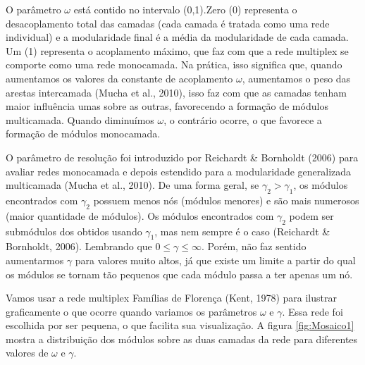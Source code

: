 \documentclass[
  12pt,
]{article}
\begin{document}
O parâmetro \(\omega\) está contido no intervalo (0,1).Zero (0)
representa o desacoplamento total das camadas (cada camada é tratada
como uma rede individual) e a modularidade final é a média da
modularidade de cada camada. Um (1) representa o acoplamento máximo, que
faz com que a rede multiplex se comporte como uma rede monocamada. Na
prática, isso significa que, quando aumentamos os valores da constante
de acoplamento \(\omega\), aumentamos o peso das arestas intercamada
(Mucha et al., 2010), isso faz com que as camadas tenham maior
influência umas sobre as outras, favorecendo a formação de módulos
multicamada. Quando diminuímos \(\omega\), o contrário ocorre, o que
favorece a formação de módulos monocamada.

O parâmetro de resolução foi introduzido por Reichardt \& Bornholdt
(2006) para avaliar redes monocamada e depois estendido para a
modularidade generalizada multicamada (Mucha et al., 2010). De uma forma
geral, se \(\gamma_2 > \gamma_1\), os módulos encontrados com
\(\gamma_2\) possuem menos nós (módulos menores) e são mais numerosos
(maior quantidade de módulos). Os módulos encontrados com \(\gamma_2\)
podem ser submódulos dos obtidos usando \(\gamma_1\), mas nem sempre é o
caso (Reichardt \& Bornholdt, 2006). Lembrando que
\(0 \leq \gamma \leq \infty\). Porém, não faz sentido aumentarmos
\(\gamma\) para valores muito altos, já que existe um limite a partir do
qual os módulos se tornam tão pequenos que cada módulo passa a ter
apenas um nó.

Vamos usar a rede multiplex Famílias de Florença (Kent, 1978) para
ilustrar graficamente o que ocorre quando variamos os parâmetros
\(\omega\) e \(\gamma\). Essa rede foi escolhida por ser pequena, o que
facilita sua visualização. A figura \ref{fig:Mosaico1} mostra a
distribuição dos módulos sobre as duas camadas da rede para diferentes
valores de \(\omega\) e \(\gamma\).
\end{document}
